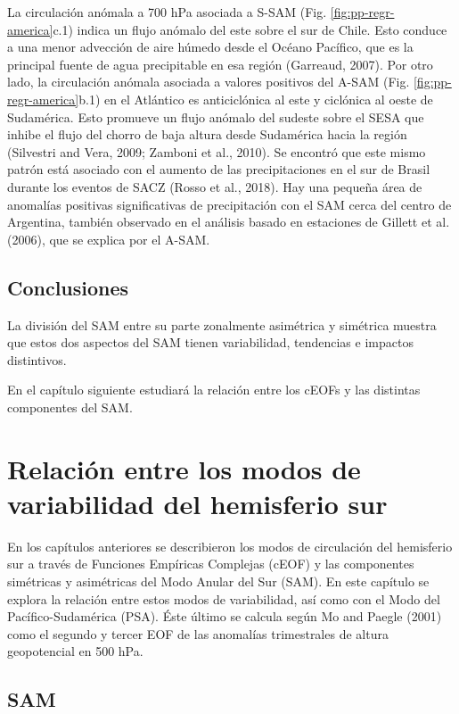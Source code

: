 \documentclass[12pt,oneside]{reedthesis}
\begin{document}
La circulación anómala a 700 hPa asociada a S-SAM (Fig. \ref{fig:pp-regr-america}c.1) indica un flujo anómalo del este sobre el sur de Chile.
Esto conduce a una menor advección de aire húmedo desde el Océano Pacífico, que es la principal fuente de agua precipitable en esa región (Garreaud, 2007).
Por otro lado, la circulación anómala asociada a valores positivos del A-SAM (Fig. \ref{fig:pp-regr-america}b.1) en el Atlántico es anticiclónica al este y ciclónica al oeste de Sudamérica.
Esto promueve un flujo anómalo del sudeste sobre el SESA que inhibe el flujo del chorro de baja altura desde Sudamérica hacia la región (Silvestri and Vera, 2009; Zamboni et al., 2010).
Se encontró que este mismo patrón está asociado con el aumento de las precipitaciones en el sur de Brasil durante los eventos de SACZ (Rosso et al., 2018).
Hay una pequeña área de anomalías positivas significativas de precipitación con el SAM cerca del centro de Argentina, también observado en el análisis basado en estaciones de Gillett et al. (2006), que se explica por el A-SAM.

\hypertarget{conclusiones-1}{%
\section{Conclusiones}\label{conclusiones-1}}

La división del SAM entre su parte zonalmente asimétrica y simétrica muestra que estos dos aspectos del SAM tienen variabilidad, tendencias e impactos distintivos.

En el capítulo siguiente estudiará la relación entre los cEOFs y las distintas componentes del SAM.

\hypertarget{sam-ceof}{%
\chapter{Relación entre los modos de variabilidad del hemisferio sur}\label{sam-ceof}}

En los capítulos anteriores se describieron los modos de circulación del hemisferio sur a través de Funciones Empíricas Complejas (cEOF) y las componentes simétricas y asimétricas del Modo Anular del Sur (SAM).
En este capítulo se explora la relación entre estos modos de variabilidad, así como con el Modo del Pacífico-Sudamérica (PSA).
Éste último se calcula según Mo and Paegle (2001) como el segundo y tercer EOF de las anomalías trimestrales de altura geopotencial en 500 hPa.

\hypertarget{sam}{%
\section{SAM}\label{sam}}
\end{document}
